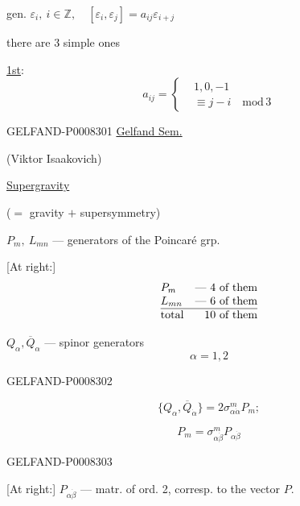 
gen. \(\varepsilon_i,\ i\in\mathbb{Z},\quad
[\varepsilon_i,\varepsilon_j]=a_{ij}\varepsilon_{i+j}\)

there are 3 simple ones

\uline{1st}:
\[
a_{ij}=\left\{\begin{aligned}
 &1,0,-1\\
 &\equiv j-i\quad\mathrm{mod}\,3
\end{aligned}\right.
\]



\begin{GelfandAdjacentEvidence}{GELFAND-P000830}{1}
 \qquad \uline{Gelfand Sem.}

 (Viktor Isaakovich)

\uline{Supergravity}

(\(=\) gravity \(+\) supersymmetry)

\(P_m,\ L_{mn}\) — generators of the Poincaré grp.

[At right:]
\[
\begin{array}{@{}lr@{}}
P_m&\text{— 4 of them}\\
L_{mn}&\text{— 6 of them}\\ \hline
\text{total}&\text{10 of them}
\end{array}
\]

\(Q_\alpha,\overline{Q}_\alpha\) — spinor generators
\[
\alpha=1,2
\]
\end{GelfandAdjacentEvidence}
\begin{GelfandAdjacentEvidence}{GELFAND-P000830}{2}


\begin{equation*}
\{Q_\alpha,\overline{Q}_{\dot\alpha}\}
=2\sigma^m_{\alpha\dot\alpha}P_m;\tag{1}
\end{equation*}

\[
P_m=\sigma^m_{\alpha\dot\beta}P_{\alpha\dot\beta}
\]
\end{GelfandAdjacentEvidence}
\begin{GelfandAdjacentEvidence}{GELFAND-P000830}{3}


[At right:] \(P_{\alpha\dot\beta}\) — matr. of ord. 2, corresp. to the vector \(P\).
\end{GelfandAdjacentEvidence}
